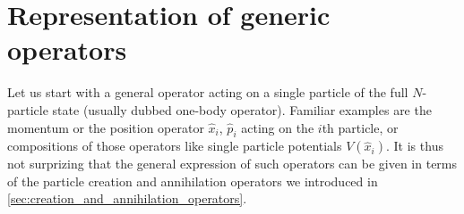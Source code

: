 \section{Representation of generic operators}
\label{sec:representation_of_generic_operators}
Let us start with a general operator acting on a single particle of the full $N$-particle state (usually dubbed one-body operator).
Familiar examples are the momentum or the position operator $\hat x_i$, $\hat p_i$ acting on the $i$th particle, or compositions of those operators like single particle potentials $V(\hat x_i)$.
It is thus not surprizing that the general expression of such operators can be given in terms of the particle creation and annihilation operators we introduced in \cref{sec:creation_and_annihilation_operators}.

